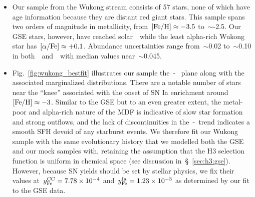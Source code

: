 \documentclass[ms.tex]{subfiles}
\begin{document}
\begin{itemize}

	\item Our sample from the Wukong stream consists of 57 stars, none of which
	have age information because they are distant red giant stars.
	This sample spans two orders of magnitude in metallicity,
	from~$\text{[Fe/H]} \approx -3.5$ to~$\sim$-2.5.
	Our GSE stars, however, have reached solar~\afe~while the least alpha-rich
	Wukong star has~$\text{[$\alpha$/Fe]} \approx +0.1$.
	Abundance uncertainties range from~$\sim$0.02 to~$\sim$0.10 in
	both~\afe~and~\feh~with median values near~$\sim$0.045.

	\item Fig.~\ref{fig:wukong_bestfit} illustrates our sample the~\afe-\feh~
	plane along with the associated marginalized distributions.
	There are a notable number of stars near the ``knee'' associated with the
	onset of SN Ia enrichment around~$\text{[Fe/H]} \approx -3$.
	Similar to the GSE but to an even greater extent, the metal-poor and
	alpha-rich nature of the MDF is indicative of slow star formation and
	strong outflows, and the lack of discontinuities in the~\afe-\feh~trend
	indicates a smooth SFH devoid of any starburst events.
	We therefore fit our Wukong sample with the same evolutionary history that
	we modelled both the GSE and our mock samples with, retaining the
	assumption that the H3 selection function is uniform in chemical space (see
	discussion in~\S~\ref{sec:h3:gse}).
	However, because SN yields should be set by stellar physics, we fix their
	values at~$y_\text{Fe}^\text{CC} = 7.78\times10^{-4}$ and~$y_\text{Fe}^\text{Ia} = 1.23\times10^{-3}$
	as determined by our fit to the GSE data.



\end{itemize}
\end{document}
